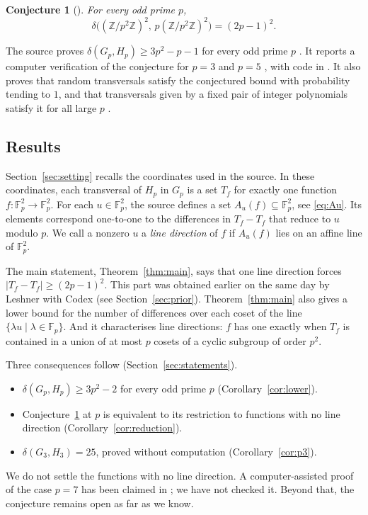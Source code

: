 \documentclass[11pt]{amsart}
\newtheorem{conjecture}[theorem]{Conjecture}
\theoremstyle{definition}\newtheorem{definition}[theorem]{Definition}
\theoremstyle{remark}\newtheorem{remark}[theorem]{Remark}
\newcommand{\F}{\mathbb{F}}
\newcommand{\Z}{\mathbb{Z}}
\newcommand{\abs}[1]{\lvert #1\rvert}
\begin{document}
\begin{conjecture}[{\cite[Conjecture~6.2]{BPT}}]\label{conj:BPT}
For every odd prime \(p\),
\[
\delta\bigl((\Z/p^2\Z)^2,\,p(\Z/p^2\Z)^2\bigr)=(2p-1)^2 .
\]
\end{conjecture}

The source proves \(\delta(G_p,H_p)\ge3p^2-p-1\) for every odd prime \(p\) \cite[Theorem~6.5]{BPT}.
It reports a computer verification of the conjecture for \(p=3\) and \(p=5\) \cite[\S6.4]{BPT}, with code in \cite{BPTcode}.
It also proves that random transversals satisfy the conjectured bound with probability tending to \(1\), and that transversals given by a fixed pair of integer polynomials satisfy it for all large \(p\) \cite[Theorems~7.1 and~7.2]{BPT}.

\subsection{Results}
Section~\ref{sec:setting} recalls the coordinates used in the source.
In these coordinates, each transversal of \(H_p\) in \(G_p\) is a set \(T_f\) for exactly one function \(f\colon\F_p^2\to\F_p^2\).
For each \(u\in\F_p^2\), the source defines a set \(A_u(f)\subseteq\F_p^2\), see \eqref{eq:Au}.
Its elements correspond one-to-one to the differences in \(T_f-T_f\) that reduce to \(u\) modulo \(p\).
We call a nonzero \(u\) a \emph{line direction} of \(f\) if \(A_u(f)\) lies on an affine line of \(\F_p^2\).

The main statement, Theorem~\ref{thm:main}, says that one line direction forces \(\abs{T_f-T_f}\ge(2p-1)^2\).
This part was obtained earlier on the same day by Leshner with Codex \cite{leshner} (see Section~\ref{sec:prior}).
Theorem~\ref{thm:main} also gives a lower bound for the number of differences over each coset of the line \(\{\lambda u\mid\lambda\in\F_p\}\).
And it characterises line directions: \(f\) has one exactly when \(T_f\) is contained in a union of at most \(p\) cosets of a cyclic subgroup of order \(p^2\).

Three consequences follow (Section~\ref{sec:statements}).
\begin{itemize}
\item \(\delta(G_p,H_p)\ge3p^2-2\) for every odd prime \(p\) (Corollary~\ref{cor:lower}).
\item Conjecture~\ref{conj:BPT} at \(p\) is equivalent to its restriction to functions with no line direction (Corollary~\ref{cor:reduction}).
\item \(\delta(G_3,H_3)=25\), proved without computation (Corollary~\ref{cor:p3}).
\end{itemize}
We do not settle the functions with no line direction.
A computer-assisted proof of the case \(p=7\) has been claimed in \cite{leshner}; we have not checked it.
Beyond that, the conjecture remains open as far as we know.
\end{document}
